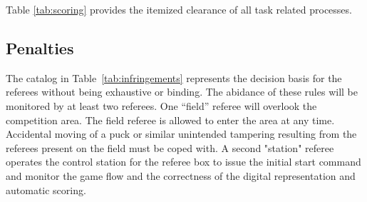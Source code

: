 \documentclass[12pt,twoside]{article}
\begin{document}
Table \ref{tab:scoring} provides the itemized clearance of all task
related processes.




\subsection{Penalties}

The catalog in Table~\ref{tab:infringements} represents the decision
basis for the referees without being exhaustive or binding.
%
The abidance of these rules will be monitored by at least two
referees.  One ``field'' referee will overlook the competition
area. The field referee is allowed to enter the area at any
time. Accidental moving of a puck or similar unintended tampering
resulting from the referees present on the field must be coped with. A
second "station" referee operates the control station for the referee box
to issue the initial start command and monitor the game flow and the
correctness of the digital representation and automatic scoring.
\end{document}
